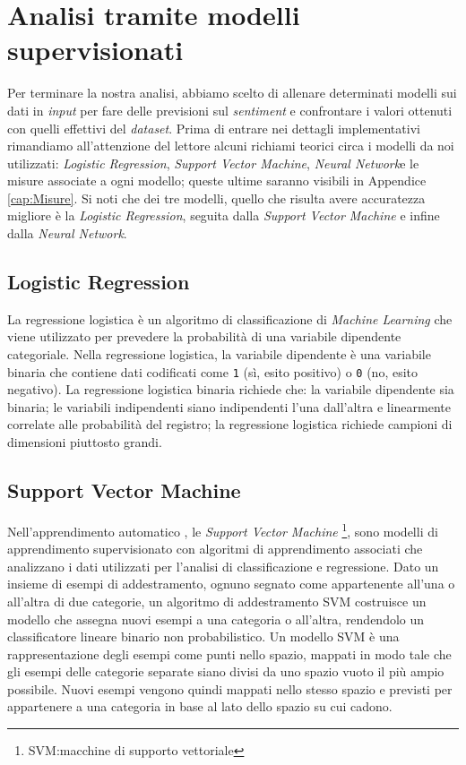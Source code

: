 \chapter{Analisi tramite modelli supervisionati}
	Per terminare la nostra analisi, abbiamo scelto di allenare determinati modelli sui dati in \textit{input} per fare delle previsioni sul \textit{sentiment} e confrontare i valori ottenuti con quelli effettivi del \textit{dataset}. Prima di entrare nei dettagli implementativi rimandiamo all'attenzione del lettore alcuni richiami teorici circa i modelli da noi utilizzati: \textit{Logistic Regression}, \textit{Support Vector Machine}, \textit{Neural Network}e le misure associate a ogni modello; queste ultime saranno visibili in Appendice \ref{cap:Misure}. Si noti che dei tre modelli, quello che risulta avere accuratezza migliore è la \textit{Logistic Regression}, seguita dalla \textit{Support Vector Machine} e  infine dalla \textit{Neural Network}. 
		
			
		\section{Logistic Regression}
			La regressione logistica è un algoritmo di classificazione di \textit{Machine Learning} che viene utilizzato per prevedere la probabilità di una variabile dipendente categoriale. Nella regressione logistica, la variabile dipendente è una variabile binaria che contiene dati codificati come \verb|1| (sì, esito positivo) o \verb|0| (no, esito negativo). La regressione logistica binaria richiede che: la variabile dipendente sia binaria; le variabili indipendenti siano indipendenti l'una dall'altra e linearmente correlate alle probabilità del registro; la regressione logistica richiede campioni di dimensioni piuttosto grandi.
			
			

		\section{Support Vector Machine}
			Nell'apprendimento automatico , le \textit{Support Vector Machine} \footnote{SVM:macchine di supporto vettoriale}, sono modelli di apprendimento supervisionato con algoritmi di apprendimento associati che analizzano i dati utilizzati per l'analisi di classificazione e regressione. Dato un insieme di esempi di addestramento, ognuno segnato come appartenente all'una o all'altra di due categorie, un algoritmo di addestramento SVM costruisce un modello che assegna nuovi esempi a una categoria o all'altra, rendendolo un classificatore lineare binario non probabilistico. Un modello SVM è una rappresentazione degli esempi come punti nello spazio, mappati in modo tale che gli esempi delle categorie separate siano divisi da uno spazio vuoto il più ampio possibile. Nuovi esempi vengono quindi mappati nello stesso spazio e previsti per appartenere a una categoria in base al lato dello spazio su cui cadono.
		
